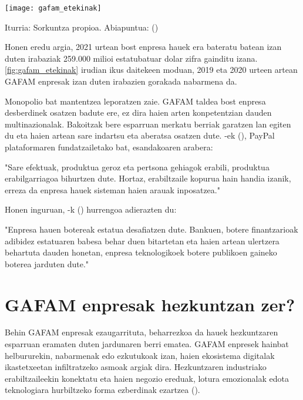 \begin{center}
    \label{fig:gafam_etekinak}
    \centering
    \texttt{[image: gafam\_etekinak]}
    \par{Iturria: Sorkuntza propioa. Abiapuntua: \citeauthor{statista2021gafam} (\citeyear{statista2021gafam})}
\end{center}

Honen eredu argia, 2021 urtean bost enpresa hauek era bateratu batean izan duten irabaziak 259.000 milioi estatubatuar dolar zifra gainditu izana. \ref{fig:gafam_etekinak} irudian ikus daitekeen moduan, 2019 eta 2020 urteen artean GAFAM enpresak izan duten irabazien gorakada nabarmena da.

Monopolio bat mantentzea leporatzen zaie. GAFAM taldea bost enpresa desberdinek osatzen badute ere, ez dira haien arten konpetentzian dauden multinazionalak. Bakoitzak bere esparruan merkatu berriak garatzen lan egiten du eta haien artean sare indartsu eta aberatsa osatzen dute. \citeauthor{thiel2014competition}-ek (\citeyear{thiel2014competition}), PayPal plataformaren fundatzailetako bat, esandakoaren arabera:

\begin{adjustwidth}{3em}{0pt}
"Sare efektuak, produktua geroz eta pertsona gehiagok erabili, produktua erabilgarriagoa bihurtzen dute. Hortaz, erabiltzaile kopurua hain handia izanik, erreza da enpresa hauek sisteman haien arauak inposatzea."
\end{adjustwidth}

Honen inguruan, \citeauthor{de2019guia}-k (\citeyear{de2019guia}) hurrengoa adierazten du:

\begin{adjustwidth}{3em}{0pt}
"Enpresa hauen botereak estatua desafiatzen dute. Bankuen, botere finantzarioak adibidez estatuaren babesa behar duen bitartetan eta haien artean ulertzera behartuta dauden honetan, enpresa teknologikoek botere publikoen gaineko boterea jarduten dute."
\end{adjustwidth}

\section{GAFAM enpresak hezkuntzan zer?}\label{sec:gafam_hezkuntza}

Behin GAFAM enpresak ezaugarrituta, beharrezkoa da hauek hezkuntzaren esparruan eramaten duten jardunaren berri ematea. GAFAM enpresek hainbat helbururekin, nabarmenak edo ezkutukoak izan, haien ekosistema digitalak ikastetxeetan infiltratzeko asmoak argiak dira. Hezkuntzaren industriako erabiltzaileekin konektatu eta haien negozio ereduak, lotura emozionalak edota teknologiara hurbiltzeko forma ezberdinak ezartzea (\cite{herranz2018gafam}).

